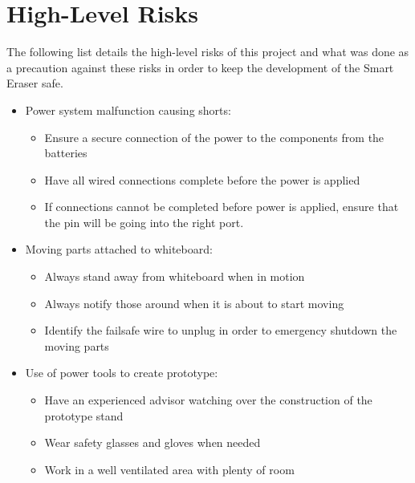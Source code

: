 \section{High-Level Risks}
The following list details the high-level risks of this project and what was done as a precaution against these risks in order to keep the development of the Smart Eraser safe.
\begin{itemize}
	\item Power system malfunction causing shorts:
		\begin{itemize}
		\item Ensure a secure connection of the power to the components from the batteries
		\item Have all wired connections complete before the power is applied
		\item If connections cannot be completed before power is applied, ensure that the pin will be going into the right port.
		\end{itemize}
	\item Moving parts attached to whiteboard:
		\begin{itemize}
		\item Always stand away from whiteboard when in motion
		\item Always notify those around when it is about to start moving
		\item Identify the failsafe wire to unplug in order to emergency shutdown the moving parts
		\end{itemize}
	\item Use of power tools to create prototype:
		\begin{itemize}
		\item Have an experienced advisor watching over the construction of the prototype stand
		\item Wear safety glasses and gloves when needed
		\item Work in a well ventilated area with plenty of room
		\end{itemize}
\end{itemize}

